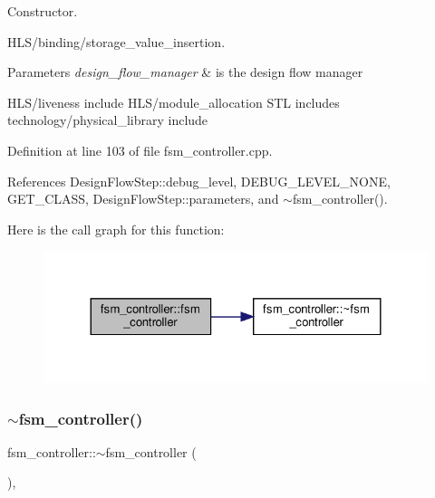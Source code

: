 Constructor. 

H\+L\+S/binding/storage\+\_\+value\+\_\+insertion.


\begin{DoxyParams}{Parameters}
{\em design\+\_\+flow\+\_\+manager} & is the design flow manager\\
\hline
\end{DoxyParams}
H\+L\+S/liveness include H\+L\+S/module\+\_\+allocation S\+TL includes technology/physical\+\_\+library include 

Definition at line 103 of file fsm\+\_\+controller.\+cpp.



References Design\+Flow\+Step\+::debug\+\_\+level, D\+E\+B\+U\+G\+\_\+\+L\+E\+V\+E\+L\+\_\+\+N\+O\+NE, G\+E\+T\+\_\+\+C\+L\+A\+SS, Design\+Flow\+Step\+::parameters, and $\sim$fsm\+\_\+controller().

Here is the call graph for this function\+:
\nopagebreak
\begin{figure}[H]
\begin{center}
\leavevmode
\includegraphics[width=324pt]{da/d3d/classfsm__controller_a3d9ecb2315c65086b2a52d4d0a30f2fc_cgraph}
\end{center}
\end{figure}
\mbox{\label{classfsm__controller_a034fb9431bbb26b2477720a27fb3d176}} 
\subsubsection{\texorpdfstring{$\sim$fsm\+\_\+controller()}{~fsm\_controller()}}
{\footnotesize\ttfamily fsm\+\_\+controller\+::$\sim$fsm\+\_\+controller (\begin{DoxyParamCaption}{ }\end{DoxyParamCaption})\hspace{0.3cm}{\ttfamily [override]}, {\ttfamily [default]}}



